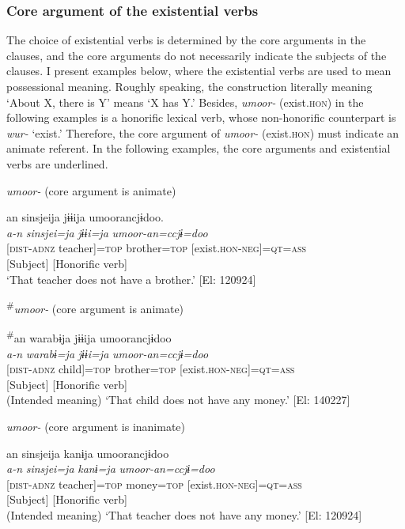 \subsubsection{Core argument of the existential verbs}

The choice of existential verbs is determined by the core arguments in the clauses, and the core arguments do not necessarily indicate the subjects of the clauses. I present examples below, where the existential verbs are used to mean possessional meaning. Roughly speaking, the construction literally meaning ‘About X, there is Y’ means ‘X has Y.’ Besides, \textit{umoor-} (exist.\textsc{hon}) in the following examples is a honorific lexical verb, whose non-honorific counterpart is \textit{wur-} ‘exist.’ Therefore, the core argument of \textit{umoor-} (exist.\textsc{hon}) must indicate an animate referent. In the following examples, the core arguments and existential verbs are underlined.

\ea\label{ex:8-35}
\ea \textit{umoor-} (core argument is animate)

{\TM}
\gllll  an  sinsjeija  jɨɨija  umoorancjɨdoo.\\
\textit{a-n}  \textit{sinsjei=ja}  \textit{jɨɨi=ja}  \textit{umoor-an=ccjɨ=doo}\\
{}[\textsc{dist}-\textsc{adnz}  teacher]=\textsc{top}  brother=\textsc{top}  [exist.\textsc{hon}-\textsc{neg}]=\textsc{qt}=\textsc{ass}\\
      {}[Subject]      [Honorific verb]\\
\glt ‘That teacher does not have a brother.’ [El: 120924]

\ex \textsuperscript{\#}\textit{umoor-} (core argument is animate)

{\TM}
\gllll  \textsuperscript{\#}an  warabɨja  jɨɨija  umoorancjɨdoo\\
\textit{a-n}  \textit{warabɨ=ja}  \textit{jɨɨi=ja}  \textit{umoor-an=ccjɨ=doo}\\
{}[\textsc{dist}-\textsc{adnz}  child]=\textsc{top}  brother=\textsc{top}  [exist.\textsc{hon}-\textsc{neg}]=\textsc{qt}=\textsc{ass}\\
      {}[Subject]      [Honorific verb]\\
\glt      (Intended meaning) ‘That child does not have any money.’ [El: 140227]

\ex *\textit{umoor-} (core argument is inanimate)

{\TM}
\gllll  *an  sinsjeija  kanɨja  umoorancjɨdoo\\
\textit{a-n}  \textit{sinsjei=ja}  \textit{kanɨ=ja}  \textit{umoor-an=ccjɨ=doo}\\
{}[\textsc{dist}-\textsc{adnz}  teacher]=\textsc{top}  money=\textsc{top}  [exist.\textsc{hon}-\textsc{neg}]=\textsc{qt}=\textsc{ass}\\
      {}[Subject]      [Honorific verb]\\
\glt       (Intended meaning) ‘That teacher does not have any money.’ [El: 120924]

